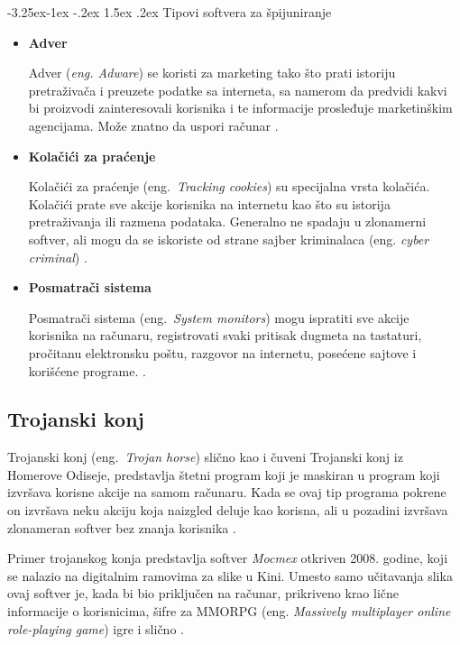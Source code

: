 \documentclass[a4paper]{article}
\makeatletter
\renewcommand\paragraph{\@startsection{paragraph}{4}{\z@}%
   {-3.25ex\@plus -1ex \@minus -.2ex}%
   {1.5ex \@plus .2ex}%
   {\normalfont\normalsize\bfseries}}
\makeatother
\begin{document}
\paragraph{Tipovi softvera za špijuniranje}
\begin{itemize}
\item \textbf{Adver}

Adver (\textit{eng. Adware}) se koristi za marketing tako što prati istoriju pretraživača i preuzete podatke sa interneta, sa 
namerom da predvidi kakvi bi proizvodi zainteresovali korisnika i te informacije prosleđuje marketinškim agencijama. Može znatno da uspori računar \cite{spyware}.

\item \textbf{Kolačići za praćenje}

Kolačići za praćenje (eng.~{\em Tracking cookies}) su
specijalna vrsta kolačića. 
Kolačići prate sve akcije korisnika na internetu kao što su istorija pretraživanja
ili razmena podataka. Generalno ne spadaju u zlonamerni
softver, ali mogu da se iskoriste od strane sajber
kriminalaca (eng. \textit{cyber criminal}) \cite{tracking_cookies}.

\item \textbf{Posmatrači sistema}

Posmatrači sistema (eng.~{\em System monitors}) mogu ispratiti sve akcije korisnika na računaru, registrovati svaki pritisak dugmeta na tastaturi, pročitanu elektronsku poštu, razgovor na internetu, posećene sajtove i korišćene programe. \cite{spyware}.
    
\end{itemize}

\subsection{Trojanski konj}
\label{Odisej}

Trojanski konj (eng.~{\em Trojan horse}) slično kao i čuveni Trojanski konj iz Homerove Odiseje, predstavlja štetni program koji je maskiran u program koji izvršava korisne akcije na samom računaru. Kada se ovaj tip programa pokrene on izvršava neku akciju koja naizgled deluje kao korisna, ali u pozadini izvršava zlonameran softver bez znanja korisnika \cite{trojanhorse}.


Primer trojanskog konja predstavlja softver \textit{Mocmex} otkriven 2008. godine, koji se nalazio na digitalnim ramovima za slike u Kini. Umesto samo učitavanja slika ovaj softver je, kada bi bio priključen na računar, prikriveno krao lične informacije o korisnicima, šifre za MMORPG (eng. \textit{Massively multiplayer online role-playing game}) igre i slično \cite{ethics}. 
\end{document}
